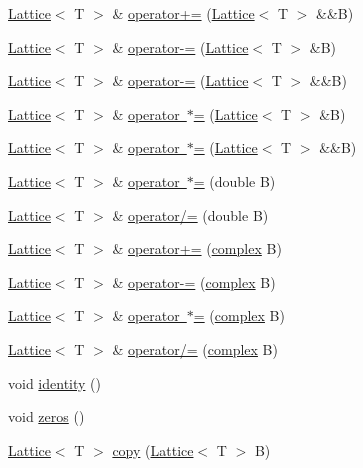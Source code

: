 \begin{DoxyCompactItemize}
\mbox{\hyperlink{class_lattice}{Lattice}}$<$ T $>$ \& \mbox{\hyperlink{class_lattice_a83e9265a5da00384a19dc47eff5f9e00}{operator+=}} (\mbox{\hyperlink{class_lattice}{Lattice}}$<$ T $>$ \&\&B)
\item 
\mbox{\hyperlink{class_lattice}{Lattice}}$<$ T $>$ \& \mbox{\hyperlink{class_lattice_abc6ee1293f4490f34f96b85233b03ed1}{operator-\/=}} (\mbox{\hyperlink{class_lattice}{Lattice}}$<$ T $>$ \&B)
\item 
\mbox{\hyperlink{class_lattice}{Lattice}}$<$ T $>$ \& \mbox{\hyperlink{class_lattice_a814b798e40210ac2aed7cbd876625c30}{operator-\/=}} (\mbox{\hyperlink{class_lattice}{Lattice}}$<$ T $>$ \&\&B)
\item 
\mbox{\hyperlink{class_lattice}{Lattice}}$<$ T $>$ \& \mbox{\hyperlink{class_lattice_a123a54c46163261b0332ff10c1f79f80}{operator $\ast$=}} (\mbox{\hyperlink{class_lattice}{Lattice}}$<$ T $>$ \&B)
\item 
\mbox{\hyperlink{class_lattice}{Lattice}}$<$ T $>$ \& \mbox{\hyperlink{class_lattice_a610be724a235b1de20babde84dcd16dd}{operator $\ast$=}} (\mbox{\hyperlink{class_lattice}{Lattice}}$<$ T $>$ \&\&B)
\item 
\mbox{\hyperlink{class_lattice}{Lattice}}$<$ T $>$ \& \mbox{\hyperlink{class_lattice_a1d7db986711ac8ff3a26e8d865d66a89}{operator $\ast$=}} (double B)
\item 
\mbox{\hyperlink{class_lattice}{Lattice}}$<$ T $>$ \& \mbox{\hyperlink{class_lattice_aafe786fd40986031094f2d76ca28640b}{operator/=}} (double B)
\item 
\mbox{\hyperlink{class_lattice}{Lattice}}$<$ T $>$ \& \mbox{\hyperlink{class_lattice_ab94a46cade378e4daa689e2ddcf61ff3}{operator+=}} (\mbox{\hyperlink{classcomplex}{complex}} B)
\item 
\mbox{\hyperlink{class_lattice}{Lattice}}$<$ T $>$ \& \mbox{\hyperlink{class_lattice_a848d049b47fe69fc99fd54d8a39b544f}{operator-\/=}} (\mbox{\hyperlink{classcomplex}{complex}} B)
\item 
\mbox{\hyperlink{class_lattice}{Lattice}}$<$ T $>$ \& \mbox{\hyperlink{class_lattice_ae4405517258f14d94479ad6f2c2f4343}{operator $\ast$=}} (\mbox{\hyperlink{classcomplex}{complex}} B)
\item 
\mbox{\hyperlink{class_lattice}{Lattice}}$<$ T $>$ \& \mbox{\hyperlink{class_lattice_afa9568877b23d2266c7d2f29fe0ec6ad}{operator/=}} (\mbox{\hyperlink{classcomplex}{complex}} B)
\item 
void \mbox{\hyperlink{class_lattice_a5ad6bf603b4b455f0368362aeeddb748}{identity}} ()
\item 
void \mbox{\hyperlink{class_lattice_a1e8bfb54f85e78f2c97e8b90d2b47dc9}{zeros}} ()
\item 
\mbox{\hyperlink{class_lattice}{Lattice}}$<$ T $>$ \mbox{\hyperlink{class_lattice_a85154fbd1b0ae42af329135c6cd11f34}{copy}} (\mbox{\hyperlink{class_lattice}{Lattice}}$<$ T $>$ B)
\end{DoxyCompactItemize}
